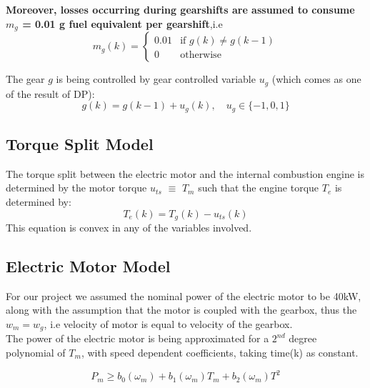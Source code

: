 \documentclass[conference]{IEEEtran}
\begin{document}
\textbf{Moreover, losses occurring during gearshifts are assumed to consume $m_g$ = 0.01 g fuel equivalent
per gearshift},i.e
\begin{equation}\label{eq1}
m_g(k)= \begin{cases}
    0.01 & \text{if } g(k)\neq g(k-1)\\
    0              & \text{otherwise}
\end{cases}
\end{equation}

The gear $g$ is being controlled by gear controlled variable $u_g$ (which comes as one of the result of DP):
\begin{equation}\label{eq1}
g(k)= g(k-1) +u_g(k), \quad u_g \in \{-1,0,1\}
\end{equation}

\subsection{Torque Split Model}
The torque split between the electric motor and the internal combustion engine is determined by the
motor torque $u_{ts}$ $\equiv$ $T_m$ such that the engine torque $T_e$ is determined by:
\begin{equation}
    T_e(k) = T_g(k) - u_{ts}(k)
\end{equation}
This equation is convex in any of the variables involved.


\subsection{Electric Motor Model}
For our project we assumed the nominal power of the electric motor to be 40kW, along with the assumption that the motor is coupled with the gearbox, thus the $w_m = w_g$, i.e velocity of motor is equal to velocity of the gearbox.\\
The power of the electric motor is being approximated for a $2^{nd}$ degree polynomial of $T_m$, with speed dependent coefficients, taking time(k) as constant.


\begin{equation}\label{eq1}
    P_m \geq b_0(\omega_m) + b_1(\omega_m)T_m + b_2(\omega_m)T^2
\end{equation}
\end{document}
